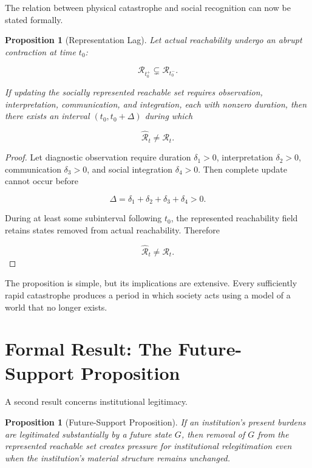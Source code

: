 \documentclass[11pt,oneside]{book}
\newtheorem{proposition}[theorem]{Proposition}
\theoremstyle{definition}
\theoremstyle{remark}
\newcommand{\R}{\mathcal{R}}
\begin{document}
The relation between physical catastrophe and social recognition can now be stated formally.

\begin{proposition}[Representation Lag]
Let actual reachability undergo an abrupt contraction at time \(t_0\):

\[
\R_{t_0^+}\subsetneq\R_{t_0^-}.
\]

If updating the socially represented reachable set requires observation, interpretation, communication, and integration, each with nonzero duration, then there exists an interval \((t_0,t_0+\Delta)\) during which

\[
\widehat{\R}_t\neq\R_t.
\]
\end{proposition}

\begin{proof}
Let diagnostic observation require duration \(\delta_1>0\), interpretation \(\delta_2>0\), communication \(\delta_3>0\), and social integration \(\delta_4>0\). Then complete update cannot occur before

\[
\Delta
=
\delta_1+\delta_2+\delta_3+\delta_4>0.
\]

During at least some subinterval following \(t_0\), the represented reachability field retains states removed from actual reachability. Therefore

\[
\widehat{\R}_t\neq\R_t.
\]
\end{proof}

The proposition is simple, but its implications are extensive. Every sufficiently rapid catastrophe produces a period in which society acts using a model of a world that no longer exists.

\section{Formal Result: The Future-Support Proposition}

A second result concerns institutional legitimacy.

\begin{proposition}[Future-Support Proposition]
If an institution's present burdens are legitimated substantially by a future state \(G\), then removal of \(G\) from the represented reachable set creates pressure for institutional relegitimation even when the institution's material structure remains unchanged.
\end{proposition}
\end{document}
